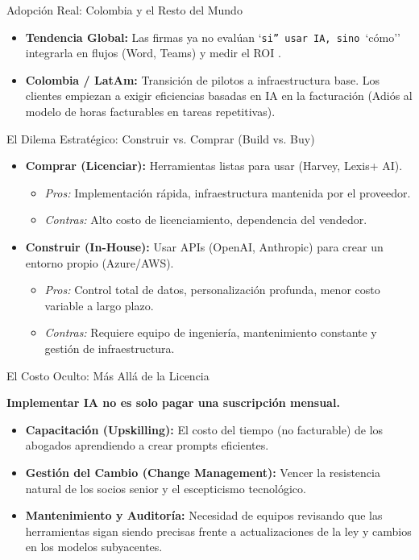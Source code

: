 \documentclass[aspectratio=169]{beamer}
\begin{document}
\begin{frame}{Adopción Real: Colombia y el Resto del Mundo}


\begin{itemize}
  \item \textbf{Tendencia Global:} Las firmas ya no evalúan `\texttt{si'' usar IA, sino }`cómo'' integrarla en flujos (Word, Teams) y medir el ROI \cite{thomsonreuters2024}.
  \item \textbf{Colombia / LatAm:} Transición de pilotos a infraestructura base. Los clientes empiezan a exigir eficiencias basadas en IA en la facturación (Adiós al modelo de horas facturables en tareas repetitivas).
\end{itemize}
\end{frame}

\begin{frame}{El Dilema Estratégico: Construir vs. Comprar (Build vs. Buy)}


\begin{itemize}
  \item \textbf{Comprar (Licenciar):} Herramientas listas para usar (Harvey, Lexis+ AI).
  \begin{itemize}
    \item \textit{Pros:} Implementación rápida, infraestructura mantenida por el proveedor.
    \item \textit{Contras:} Alto costo de licenciamiento, dependencia del vendedor.
  \end{itemize}
  \item \textbf{Construir (In-House):} Usar APIs (OpenAI, Anthropic) para crear un entorno propio (Azure/AWS).
  \begin{itemize}
    \item \textit{Pros:} Control total de datos, personalización profunda, menor costo variable a largo plazo.
    \item \textit{Contras:} Requiere equipo de ingeniería, mantenimiento constante y gestión de infraestructura.
  \end{itemize}
\end{itemize}
\end{frame}

\begin{frame}{El Costo Oculto: Más Allá de la Licencia}


\textbf{Implementar IA no es solo pagar una suscripción mensual.}

\begin{itemize}
  \item \textbf{Capacitación (Upskilling):} El costo del tiempo (no facturable) de los abogados aprendiendo a crear prompts eficientes.
  \item \textbf{Gestión del Cambio (Change Management):} Vencer la resistencia natural de los socios senior y el escepticismo tecnológico.
  \item \textbf{Mantenimiento y Auditoría:} Necesidad de equipos revisando que las herramientas sigan siendo precisas frente a actualizaciones de la ley y cambios en los modelos subyacentes.
\end{itemize}
\end{frame}
\end{document}
